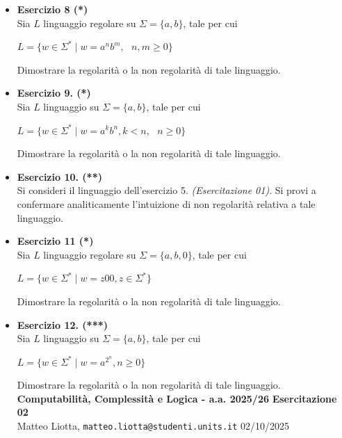 \documentclass[a4paper,10pt]{article}
\newcommand{\EsercitazioneNum}{02}
\newcommand{\Data}{02/10/2025}
\begin{document}
{\normalsize
\begin{itemize}[label=, leftmargin=0pt]

    \item \textbf{Esercizio 8 (*)}\\ Sia $L$ linguaggio regolare su $\Sigma=\{a,b\}$, tale per cui 
    {\begin{center}
        $L = \{ w \in \Sigma^* \mid w = a^nb^m,\ \ \  n,m\geq0 \}$
    \end{center}} 
    Dimostrare la regolarità o la non regolarità di tale linguaggio.\\[0.1cm]


    \item \textbf{Esercizio 9. (*)}\\ Sia $L$ linguaggio su $\Sigma=\{a,b\}$, tale per cui 
    {\begin{center}
        $L = \{ w \in \Sigma^* \mid w = a^kb^n, k<n, \ \ \ n\geq 0\}$
    \end{center}} 
    Dimostrare la regolarità o la non regolarità di tale linguaggio.\\[0.1cm]

    \item \textbf{Esercizio 10. (**)}\\ Si consideri il linguaggio dell'esercizio 5. \textit{(Esercitazione 01)}. Si provi a confermare analiticamente l'intuizione di non regolarità relativa a tale linguaggio. \\[0.1cm]

    \item \textbf{Esercizio 11 (*)}\\ Sia $L$ linguaggio regolare su $\Sigma=\{a,b,0\}$, tale per cui 
    {\begin{center}
        $L = \{ w \in \Sigma^* \mid w = z00, z \in \Sigma^* \}$
    \end{center}} 
    Dimostrare la regolarità o la non regolarità di tale linguaggio.\\[0.1cm]

    \item \textbf{Esercizio 12. (***)}\\ Sia $L$ linguaggio su $\Sigma=\{a,b\}$, tale per cui 
    {\begin{center}
        $L = \{ w \in \Sigma^* \mid w = a^{2^n}, n\geq 0\}$
    \end{center}} 
    Dimostrare la regolarità o la non regolarità di tale linguaggio.\\[0.1cm]

    
    \vfill
    \noindent\makebox[\linewidth]{\rule{\linewidth}{0.4pt}}
    \newpage
    {\noindent
    \small \textbf{Computabilità, Complessità e Logica - a.a. 2025/26} \hfill \textbf{Esercitazione \EsercitazioneNum} \\[0.2cm]
    \scriptsize Matteo Liotta, \texttt{matteo.liotta@studenti.units.it} \hfill \Data \\[0.2cm]
    \noindent\makebox[\linewidth]{\rule{\linewidth}{0.4pt}} \\[0.3cm]}



\end{itemize}}
\end{document}
